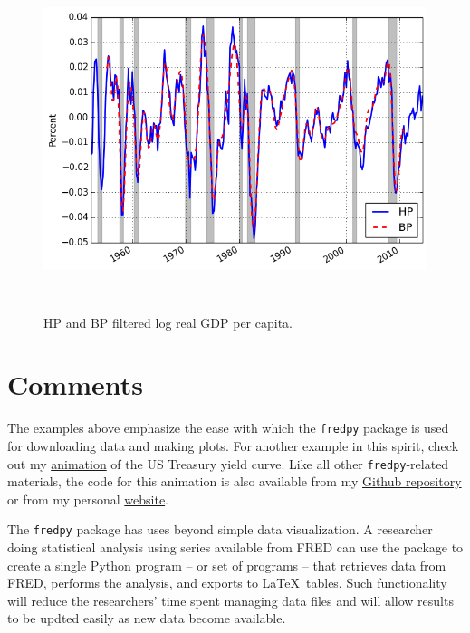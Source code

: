 \documentclass[11pt,fleqn]{article}
\newcommand{\ttt}{\texttt}
\begin{document}
\begin{figure}[h] \caption{\label{fig:3} HP and BP filtered log real GDP per capita.}
\begin{center}
\includegraphics[height = 10cm]{fig_fredpy_example3.png}
\end{center}
\end{figure}


\section{Comments}

The examples above emphasize the ease with which the \ttt{fredpy} package is used for downloading data and making plots. For another example in this spirit, check out my \href{http://youtu.be/34bIQGrndao}{animation} of the US Treasury yield curve. Like all other \ttt{fredpy}-related materials, the code for this animation is also available from my \href{https://github.com/letsgoexploring/fredpy-package}{Github repository} or from my personal \href{http://www.briancjenkins.com/code/fredpy.html}{website}.

The \ttt{fredpy} package has uses beyond simple data visualization. A researcher doing statistical analysis using series available from FRED can use the package to create a single Python program -- or set of programs -- that retrieves data from FRED, performs the analysis, and exports to \LaTeX \ tables. Such functionality will reduce the researchers' time spent managing data files and will allow results to be updted easily as new data become available.
\end{document}
